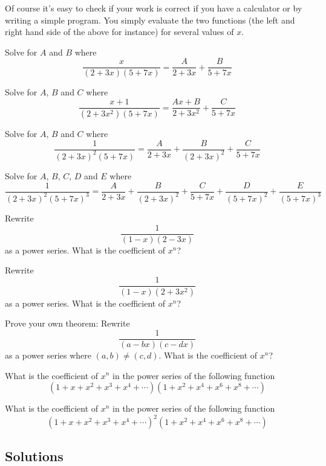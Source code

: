 Of course it's easy to check if your work is correct if you have
a calculator or by writing a simple program.
You simply evaluate the two functions (the left and right hand side of the
above for instance) for several values of $x$.



\newpage
\begin{ex}
Solve for $A$ and $B$  where
\[
\frac{x}{(2 + 3x)(5 + 7x)} = \frac{A}{2 + 3x} + \frac{B}{5 + 7x}
\]
\end{ex}


\newpage
\begin{ex}
Solve for $A$, $B$ and $C$ where
\[
\frac{x+1}{(2 + 3x^2)(5 + 7x)} 
= 
\frac{Ax + B}{2 + 3x^2} + \frac{C}{5 + 7x}
\]
\end{ex}


\newpage
\begin{ex}
Solve for $A$, $B$ and $C$ where
\[
\frac{1}{(2 + 3x)^2(5 + 7x)} 
= 
\frac{A}{2 + 3x} + \frac{B}{(2 + 3x)^2} + \frac{C}{5 + 7x}
\]
\end{ex}


\newpage
\begin{ex}
Solve for $A$, $B$, $C$, $D$ and $E$ where
\[
\frac{1}{(2 + 3x)^2(5 + 7x)^3} 
= 
\frac{A}{2 + 3x} + \frac{B}{(2 + 3x)^2} + 
\frac{C}{5 + 7x} + 
\frac{D}{(5 + 7x)^2} +
\frac{E}{(5 + 7x)^3}
\]
\end{ex}


\newpage
\begin{ex}
Rewrite
\[
\frac{1}{(1 - x)(2 - 3x)}
\]
as a power series. What is the coefficient of $x^n$?
\end{ex}

\newpage
\begin{ex}
Rewrite
\[
\frac{1}{(1 - x)(2 + 3x^2)}
\]
as a power series. What is the coefficient of $x^n$?
\end{ex}



\newpage
\begin{ex}
Prove your own theorem:
Rewrite
\[
\frac{1}{(a - bx)(c - dx)}
\]
as a power series where $(a,b) \neq (c,d)$.
What is the coefficient of $x^n$?
\end{ex}



\newpage
\begin{ex}
What is the coefficient of $x^n$ in the power series
of the following function 
\[
(1 + x + x^2 + x^3 + x^4 + \cdots)
(1 + x^2 + x^4 + x^6 + x^8 + \cdots)
\]
\end{ex}

\newpage
\begin{ex}
What is the coefficient of $x^n$ in the power series
of the following function 
\[
(1 + x + x^2 + x^3 + x^4 + \cdots)^2
(1 + x^2 + x^4 + x^6 + x^8 + \cdots)
\]
\end{ex}

\newpage
\subsection*{Solutions}

